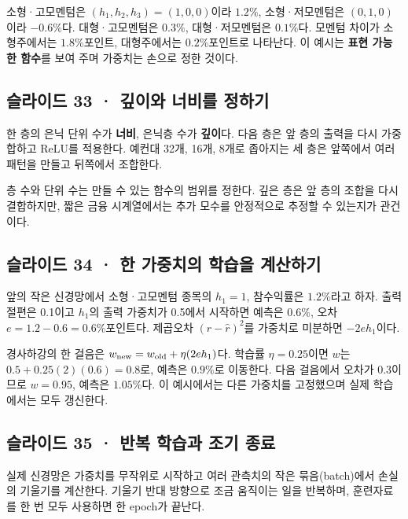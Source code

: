 \documentclass[11pt,a4paper]{article}
\begin{document}
소형·고모멘텀은 $(h_1,h_2,h_3)=(1,0,0)$이라 $1.2\%$, 소형·저모멘텀은 $(0,1,0)$이라 $-0.6\%$다. 대형·고모멘텀은 $0.3\%$, 대형·저모멘텀은 $0.1\%$다. 모멘텀 차이가 소형주에서는 $1.8\%$포인트, 대형주에서는 $0.2\%$포인트로 나타난다. 이 예시는 \textbf{표현 가능한 함수}를 보여 주며 가중치는 손으로 정한 것이다.\par

\subsection{슬라이드 33 · 깊이와 너비를 정하기}
한 층의 은닉 단위 수가 \textbf{너비}, 은닉층 수가 \textbf{깊이}다. 다음 층은 앞 층의 출력을 다시 가중합하고 ReLU를 적용한다. 예컨대 32개, 16개, 8개로 좁아지는 세 층은 앞쪽에서 여러 패턴을 만들고 뒤쪽에서 조합한다.\par

층 수와 단위 수는 만들 수 있는 함수의 범위를 정한다. 깊은 층은 앞 층의 조합을 다시 결합하지만, 짧은 금융 시계열에서는 추가 모수를 안정적으로 추정할 수 있는지가 관건이다.\par

\subsection{슬라이드 34 · 한 가중치의 학습을 계산하기}
앞의 작은 신경망에서 소형·고모멘텀 종목의 $h_1=1$, 참수익률은 $1.2\%$라고 하자. 출력 절편은 0.1이고 $h_1$의 출력 가중치가 0.5에서 시작하면 예측은 $0.6\%$, 오차 $e=1.2-0.6=0.6\%$포인트다. 제곱오차 $(r-\hat r)^2$를 가중치로 미분하면 $-2eh_1$이다.\par

경사하강의 한 걸음은 $w_{\rm new}=w_{\rm old}+\eta(2eh_1)$다. 학습률 $\eta=0.25$이면 $w$는 $0.5+0.25(2)(0.6)=0.8$로, 예측은 $0.9\%$로 이동한다. 다음 걸음에서 오차가 0.3이므로 $w=0.95$, 예측은 $1.05\%$다. 이 예시에서는 다른 가중치를 고정했으며 실제 학습에서는 모두 갱신한다.\par

\subsection{슬라이드 35 · 반복 학습과 조기 종료}
실제 신경망은 가중치를 무작위로 시작하고 여러 관측치의 작은 묶음(batch)에서 손실의 기울기를 계산한다. 기울기 반대 방향으로 조금 움직이는 일을 반복하며, 훈련자료를 한 번 모두 사용하면 한 epoch가 끝난다.\par
\end{document}
